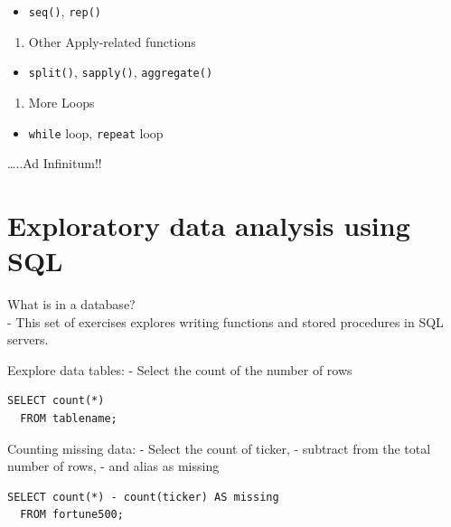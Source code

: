 \documentclass[]{book}
\providecommand{\tightlist}{%
  \setlength{\itemsep}{0pt}\setlength{\parskip}{0pt}}
\begin{document}
\begin{itemize}
\tightlist
\item
  \texttt{seq()}, \texttt{rep()}
\end{itemize}

\begin{enumerate}
\def\labelenumi{\arabic{enumi}.}
\setcounter{enumi}{25}
\tightlist
\item
  Other Apply-related functions\\
\end{enumerate}

\begin{itemize}
\tightlist
\item
  \texttt{split()}, \texttt{sapply()}, \texttt{aggregate()}
\end{itemize}

\begin{enumerate}
\def\labelenumi{\arabic{enumi}.}
\setcounter{enumi}{26}
\tightlist
\item
  More Loops\\
\end{enumerate}

\begin{itemize}
\tightlist
\item
  \texttt{while} loop, \texttt{repeat} loop
\end{itemize}

\ldots{}..Ad Infinitum!!

\hypertarget{exploratory-data-analysis-using-sql}{%
\chapter{Exploratory data analysis using SQL}\label{exploratory-data-analysis-using-sql}}

What is in a database?\\
- This set of exercises explores writing functions and stored procedures in SQL servers.

Eexplore data tables:
- Select the count of the number of rows

\begin{verbatim}
SELECT count(*) 
  FROM tablename;
\end{verbatim}

Counting missing data:
- Select the count of ticker,
- subtract from the total number of rows,
- and alias as missing

\begin{verbatim}
SELECT count(*) - count(ticker) AS missing
  FROM fortune500;
\end{verbatim}
\end{document}
